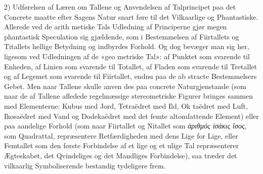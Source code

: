 \documentclass[12pt,a4paper]{book}
\newcommand{\gk}[1]{\textit{#1}}
\begin{document}
2) Udførelsen af Læren om Tallene og Anvendelsen af
Talprincipet paa det Concrete maatte efter Sagens Natur snart
føre til det Vilkaarlige og Phantastiske. Allerede ved de arith\-%
metiske Tals Udledning af Principerne gjør megen phantastisk
Speculation sig gjældende, som i Bestemmelsen af Fiirtallets
og Titallets hellige Betydning og indbyrdes Forhold. Og dog
bevæger man sig her, ligesom ved Udledningen af de «geo\-%
metriske Tal»: af Punktet som svarende til Enheden, af Linien
som svarende til Totallet, af Fladen som svarende til Tretallet
og af Legemet som svarende til Fiirtallet, endnu paa de ab\-%
stracte Bestemmelsers Gebet. Men naar Tallene skulle anven\-%
des paa concrete Naturgjenstande (som naar de af Tallene
afledede regelmæssige stereometriske Figurer bringes sammen
med Elementerne: Kubus med Jord, Tetraëdret med Ild, Ok\-%
taëdret med Luft, Ikosaëdret med Vand og Dodekaëdret med
det femte altomfattende Element) eller paa aandelige Forhold
(som naar Fiirtallet og Nitallet som \gk{ἀριθμός ἰσάκις ἴσος}, som
Quadrattal, repræsentere Retfærdigheden med dens Lige for
Lige, eller Femtallet som den første Forbindelse af et lige og
et ulige Tal repræsenterer Ægteskabet, det Qvindeliges og det
Mandliges Forbindelse), saa træder det vilkaarlig Symboliserende
bestandig tydeligere frem.
\end{document}
